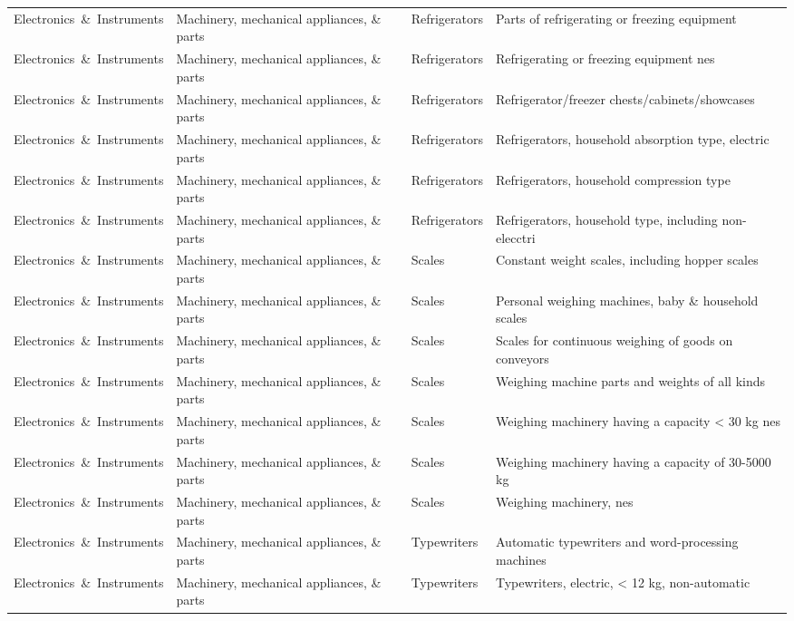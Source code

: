 \begin{appendices}
\begin{xltabular}{\textwidth}{|p{0.14\textwidth}|p{0.28\textwidth}|p{0.18\textwidth}|p{0.30\textwidth}|}
Electronics\ \&\ Instruments & Machinery, mechanical appliances, \& parts & Refrigerators & Parts of refrigerating or freezing equipment \\
Electronics\ \&\ Instruments & Machinery, mechanical appliances, \& parts & Refrigerators & Refrigerating or freezing equipment nes \\
Electronics\ \&\ Instruments & Machinery, mechanical appliances, \& parts & Refrigerators & Refrigerator/freezer chests/cabinets/showcases \\
Electronics\ \&\ Instruments & Machinery, mechanical appliances, \& parts & Refrigerators & Refrigerators, household absorption type, electric \\
Electronics\ \&\ Instruments & Machinery, mechanical appliances, \& parts & Refrigerators & Refrigerators, household compression type \\
Electronics\ \&\ Instruments & Machinery, mechanical appliances, \& parts & Refrigerators & Refrigerators, household type, including non-elecctri \\
Electronics\ \&\ Instruments & Machinery, mechanical appliances, \& parts & Scales & Constant weight scales, including hopper scales \\
Electronics\ \&\ Instruments & Machinery, mechanical appliances, \& parts & Scales & Personal weighing machines, baby \& household scales \\
Electronics\ \&\ Instruments & Machinery, mechanical appliances, \& parts & Scales & Scales for continuous weighing of goods on conveyors \\
Electronics\ \&\ Instruments & Machinery, mechanical appliances, \& parts & Scales & Weighing machine parts and weights of all kinds \\
Electronics\ \&\ Instruments & Machinery, mechanical appliances, \& parts & Scales & Weighing machinery having a capacity < 30 kg nes \\
Electronics\ \&\ Instruments & Machinery, mechanical appliances, \& parts & Scales & Weighing machinery having a capacity of 30-5000 kg \\
Electronics\ \&\ Instruments & Machinery, mechanical appliances, \& parts & Scales & Weighing machinery, nes \\
Electronics\ \&\ Instruments & Machinery, mechanical appliances, \& parts & Typewriters & Automatic typewriters and word-processing machines \\
Electronics\ \&\ Instruments & Machinery, mechanical appliances, \& parts & Typewriters & Typewriters, electric, < 12 kg, non-automatic \\

\end{xltabular}
\end{appendices}
